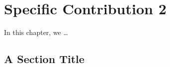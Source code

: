\documentclass[../thesis.tex]{subfiles}
\begin{document}
\chapter{Specific Contribution 2}
\label{ch:pruning}
In this chapter, we \ldots
\section{A Section Title}
\lipsum[17]
\end{document}

